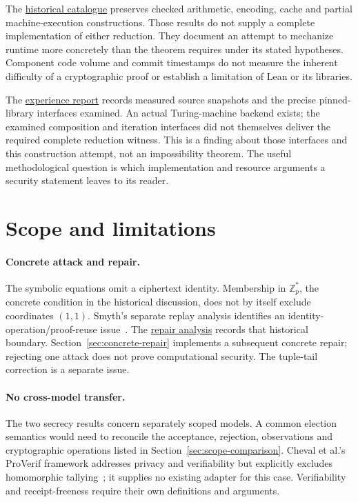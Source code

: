 \documentclass[11pt]{article}
\begin{document}
The \href{catalogue.pdf}{historical catalogue} preserves checked arithmetic,
encoding, cache and partial machine-execution constructions. Those results do
not supply a complete implementation of either reduction. They document an
attempt to mechanize runtime more concretely than the theorem requires under
its stated hypotheses. Component code volume and commit timestamps do not measure
the inherent difficulty of a cryptographic proof or establish a limitation of
Lean or its libraries.

The \href{../research/helios-development-experience.md}{experience report}
records measured source snapshots and the precise pinned-library interfaces
examined. An actual Turing-machine backend exists; the examined composition and
iteration interfaces did not themselves deliver the required complete reduction
witness. This is a finding about those interfaces and this construction attempt,
not an impossibility theorem. The useful methodological question is which
implementation and resource arguments a security statement leaves to its reader.
\section{Scope and limitations}\label{sec:future}
\paragraph{Concrete attack and repair.}
The symbolic equations omit a ciphertext identity. Membership in
$\mathbb Z_p^*$, the concrete condition in the historical discussion, does
not by itself exclude coordinates $(1,1)$. Smyth's separate replay analysis
identifies an identity-operation/proof-reuse issue~\cite{smyth}. The
\href{../research/helios-repair-ambiguity.md}{repair analysis} records that
historical boundary. Section~\ref{sec:concrete-repair} implements a subsequent
concrete repair; rejecting one attack does not prove computational security.
The tuple-tail correction is a separate issue.

\paragraph{No cross-model transfer.}
The two secrecy results concern separately scoped models. A common election
semantics would need to reconcile the acceptance, rejection, observations and
cryptographic operations listed in Section~\ref{sec:scope-comparison}.
Cheval et al.'s ProVerif framework addresses privacy and verifiability but
explicitly excludes homomorphic tallying~\cite{elections}; it supplies no existing
adapter for this case. Verifiability and receipt-freeness require their own
definitions and arguments.
\end{document}

